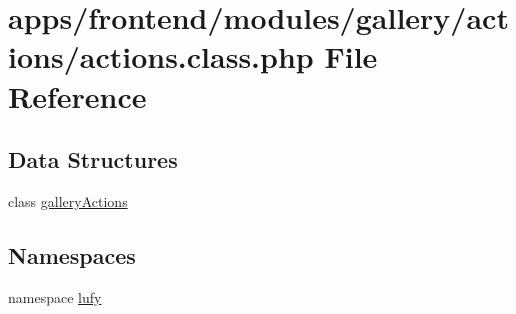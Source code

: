 \hypertarget{frontend_2modules_2gallery_2actions_2actions_8class_8php}{\section{apps/frontend/modules/gallery/actions/actions.class.\-php File Reference}
\label{frontend_2modules_2gallery_2actions_2actions_8class_8php}
}
\subsection*{Data Structures}
\begin{DoxyCompactItemize}
\item 
class \hyperlink{classgallery_actions}{gallery\-Actions}
\end{DoxyCompactItemize}
\subsection*{Namespaces}
\begin{DoxyCompactItemize}
\item 
namespace \hyperlink{namespacelufy}{lufy}
\end{DoxyCompactItemize}
